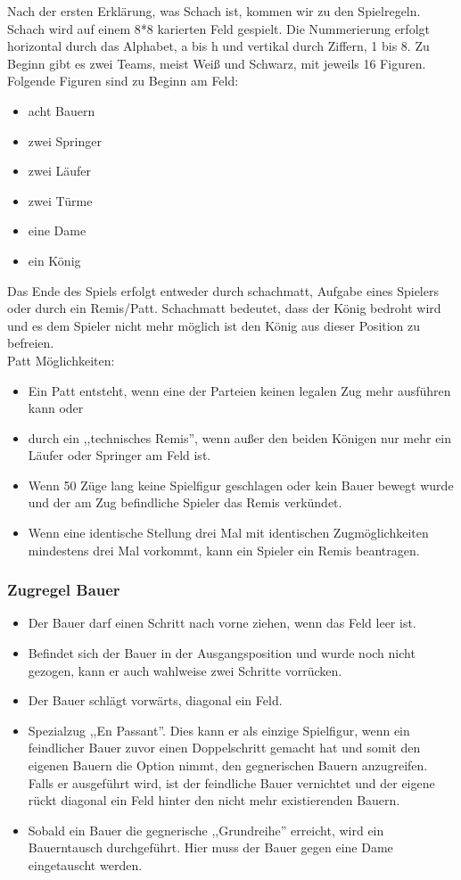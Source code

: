 \documentclass[12pt,a4paper]{article}
\begin{document}
Nach der ersten Erklärung, was Schach ist, kommen wir zu den Spielregeln.
Schach wird auf einem 8*8 karierten Feld gespielt. Die Nummerierung erfolgt horizontal durch das Alphabet, a bis h und vertikal durch Ziffern, 1 bis 8.
Zu Beginn gibt es zwei Teams, meist Weiß und Schwarz, mit jeweils 16 Figuren.
Folgende Figuren sind zu Beginn am Feld:
\begin{itemize}
	\item{acht Bauern}
	\item{zwei Springer}
	\item{zwei Läufer}
	\item{zwei Türme}
	\item{eine Dame}
	\item{ein König}
\end{itemize}
Das Ende des Spiels erfolgt entweder durch schachmatt, Aufgabe eines Spielers oder durch ein Remis/Patt. Schachmatt bedeutet, dass der König bedroht wird und es dem Spieler nicht mehr möglich ist den König aus dieser Position zu befreien.\\
Patt Möglichkeiten:
\begin{itemize}
	\item{Ein Patt entsteht, wenn eine der Parteien keinen legalen Zug mehr ausführen kann oder }
	\item{durch ein ,,technisches Remis'', wenn außer den beiden Königen nur mehr ein Läufer oder Springer am Feld ist.}
	\item{Wenn 50 Züge lang keine Spielfigur geschlagen oder kein Bauer bewegt wurde und der am Zug befindliche Spieler das Remis verkündet.}
	\item{Wenn eine identische Stellung drei Mal mit identischen Zugmöglichkeiten mindestens drei Mal vorkommt, kann ein Spieler ein Remis beantragen.}
\end{itemize}

\subsubsection{Zugregel Bauer}
\label{SUBSUBSEC:PAWN}
\begin{itemize}
	\item{Der Bauer darf einen Schritt nach vorne ziehen, wenn das Feld leer ist.}
	\item{Befindet sich der Bauer in der Ausgangsposition und wurde noch nicht gezogen, kann er auch wahlweise zwei Schritte vorrücken.}
	\item{Der Bauer schlägt vorwärts, diagonal ein Feld.}
	\item{Spezialzug ,,En Passant''. Dies kann er als einzige Spielfigur, wenn ein feindlicher Bauer zuvor einen Doppelschritt gemacht hat und somit den eigenen Bauern die Option nimmt, den gegnerischen Bauern anzugreifen. Falls er ausgeführt wird, ist der feindliche Bauer vernichtet und der eigene rückt diagonal ein Feld hinter den nicht mehr existierenden Bauern.}
	\item{Sobald ein Bauer die gegnerische ,,Grundreihe'' erreicht, wird ein Bauerntausch durchgeführt. Hier muss der Bauer gegen eine Dame eingetauscht werden.}
\end{itemize}
\end{document}
